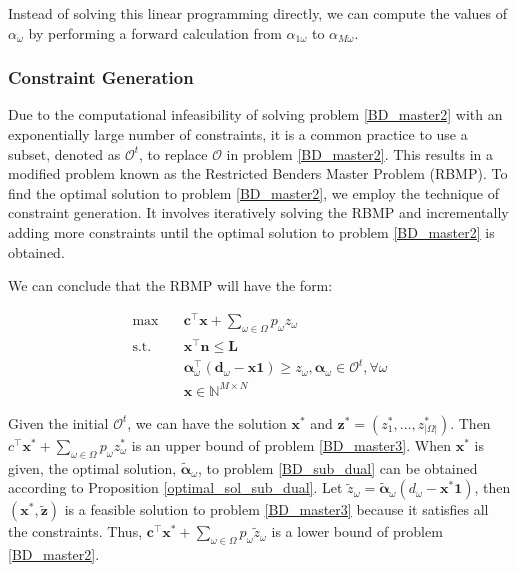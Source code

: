 


Instead of solving this linear programming directly, we can compute the values of $\alpha_{\omega}$ by performing a forward calculation from $\alpha_{1\omega}$ to $\alpha_{M\omega}$. 

\subsubsection{Constraint Generation}\label{bender_stage}
Due to the computational infeasibility of solving problem \eqref{BD_master2} with an exponentially large number of constraints, it is a common practice to use a subset, denoted as $\mathcal{O}^t$, to replace $\mathcal{O}$ in problem \eqref{BD_master2}. This results in a modified problem known as the Restricted Benders Master Problem (RBMP). To find the optimal solution to problem \eqref{BD_master2}, we employ the technique of constraint generation. It involves iteratively solving the RBMP and incrementally adding more constraints until the optimal solution to problem \eqref{BD_master2} is obtained.

We can conclude that the RBMP will have the form:

\begin{equation}\label{BD_master3}
  \begin{aligned}
    \max \quad & \mathbf{c}^{\intercal} \mathbf{x} + \sum_{\omega \in \Omega} p_{\omega} z_{\omega} \\
    \text {s.t.} \quad & \mathbf{x}^{\intercal} \mathbf{n}  \leq \mathbf{L} \\
    & \bm{\alpha}_{\omega}^{\intercal}(\mathbf{d}_{\omega}- \mathbf{x} \mathbf{1}) \geq z_{\omega}, \bm{\alpha}_{\omega} \in \mathcal{O}^{t}, \forall \omega \\
     & \mathbf{x} \in \mathbb{N}^{M \times N}
  \end{aligned}
\end{equation}

Given the initial $\mathcal{O}^{t}$, we can have the solution $\mathbf{x}^{*}$ and $\mathbf{z}^{*} =(z^{*}_1,\ldots, z^{*}_{|\Omega|})$. Then $c^{\intercal} \mathbf{x}^{*} + \sum_{\omega \in \Omega} p_{\omega} z_{\omega}^{*}$ is an upper bound of problem \eqref{BD_master3}. When $\mathbf{x}^{*}$ is given, the optimal solution, $\bm{\tilde{\alpha}}_{\omega}$, to problem \eqref{BD_sub_dual} can be obtained according to Proposition \ref{optimal_sol_sub_dual}. Let $\tilde{z}_{\omega} = \bm{\tilde{\alpha}}_{\omega}(d_{\omega} - \mathbf{x}^{*} \mathbf{1})$, then $(\mathbf{x}^{*}, \mathbf{\tilde{z}})$ is a feasible solution to problem \eqref{BD_master3} because it satisfies all the constraints. Thus, $\mathbf{c}^{\intercal} \mathbf{x}^{*} + \sum_{\omega \in \Omega} p_{\omega} \tilde{z}_{\omega}$ is a lower bound of problem \eqref{BD_master2}.


